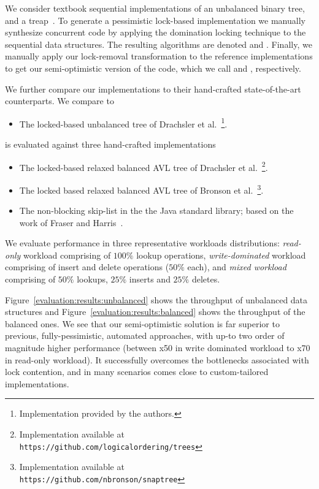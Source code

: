 We consider textbook sequential implementations of an unbalanced binary
tree, and a treap~\cite{AragonS1989}. To
generate a pessimistic lock-based implementation we manually synthesize
concurrent code by applying the domination locking technique to the sequential
data structures. The resulting algorithms are denoted \domTree and \domTreap.
Finally, we manually apply our lock-removal transformation to the reference
implementations to get our semi-optimistic version of the code, which we call
\autoTree and \autoTreap, respectively.     

We further compare our implementations to their hand-crafted state-of-the-art counterparts. We compare \autoTree to
\begin{itemize}
\item \danaTree The locked-based 
				unbalanced tree of Drachsler et
				al.~\cite{DrachslerVY2014}\footnote{Implementation provided by the authors.}.
\end{itemize}
\autoTreap is evaluated against three hand-crafted implementations
\begin{itemize}
\item \danaAVL The locked-based relaxed balanced AVL tree of 
				Drachsler et al.~\cite{DrachslerVY2014}\footnote{Implementation available at \\
				\texttt{https://github.com/logicalordering/trees}}.
\item \bronson The locked based relaxed balanced AVL tree
				of Bronson et al.~\cite{BronsonCCO2010}\footnote{Implementation available at \\
				\texttt{https://github.com/nbronson/snaptree}}.
\item \skiplist The non-blocking skip-list in the 
				the Java standard library; based on the work of
				Fraser and Harris~\cite{fraser2004practical}.
\end{itemize}

We evaluate performance in three representative workloads distributions:
\emph{read-only} workload comprising of $100\%$ lookup operations, \emph{write-dominated}
workload comprising of insert and delete operations ($50\%$ each), and
\emph{mixed workload} comprising of $50\%$ lookups, $25\%$ inserts and $25\%$
deletes.

Figure~\ref{evaluation:results:unbalanced} 
shows the throughput of unbalanced data structures and Figure~\ref{evaluation:results:balanced} shows
the throughput of the balanced ones. We see that our semi-optimistic
solution is far superior to previous, fully-pessimistic, 
automated approaches, with up-to two order of magnitude higher performance
(between x50 in write dominated workload to x70 in read-only workload). It
successfully overcomes the bottlenecks associated with lock contention, and in
many scenarios comes close to custom-tailored implementations. 

